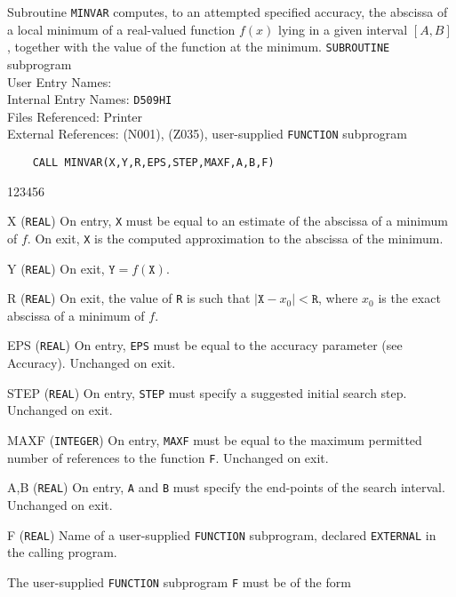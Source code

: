                     
                 
\Submitter{}                          
                     
Subroutine {\tt MINVAR} computes, to an attempted specified accuracy,
the abscissa of a local minimum of a real-valued function $f(x)$
lying in a given interval $[A,B]$, together with the value of the
function at the minimum.
\Structure
{\tt SUBROUTINE} subprogram \\
User Entry Names:   \\
Internal Entry  Names: {\tt D509HI}\\
Files Referenced: Printer\\
External References:  (N001),  (Z035),
user-supplied {\tt FUNCTION} subprogram
\Usage
\begin{verbatim}
    CALL MINVAR(X,Y,R,EPS,STEP,MAXF,A,B,F)
\end{verbatim}
\begin{DLtt}{123456}
\item[X]({\tt REAL}) On entry, {\tt X} must be equal to an estimate
of the abscissa of a minimum of $f$. On exit, {\tt X} is the computed
approximation to the abscissa of the minimum.
\item [Y]({\tt REAL}) On exit, $\mathtt{Y}=f(\mathtt{X})$.
\item [R]({\tt REAL}) On exit, the value of {\tt R} is such that
$|\mathtt{X} - x_0|<\mathtt{R}$, where $x_0$ is the exact abscissa of
a minimum of $f$.
\item [EPS]({\tt REAL}) On entry, {\tt EPS} must be equal to the accuracy
parameter (see Accuracy). Unchanged on exit.
\item [STEP]({\tt REAL}) On entry, {\tt STEP} must specify a suggested
initial search step. Unchanged on exit.
\item [MAXF] ({\tt INTEGER}) On entry, {\tt MAXF} must be equal to the
maximum permitted number of references to the function {\tt F}.
Unchanged on exit.
\item [A,B]({\tt REAL}) On entry, {\tt A} and {\tt B} must specify the
end-points of the search interval. Unchanged on exit.
\item [F]({\tt REAL}) Name of a user-supplied {\tt FUNCTION}
subprogram, declared {\tt EXTERNAL} in the calling program.
\end{DLtt}
The user-supplied {\tt FUNCTION} subprogram {\tt F} must be of the form
